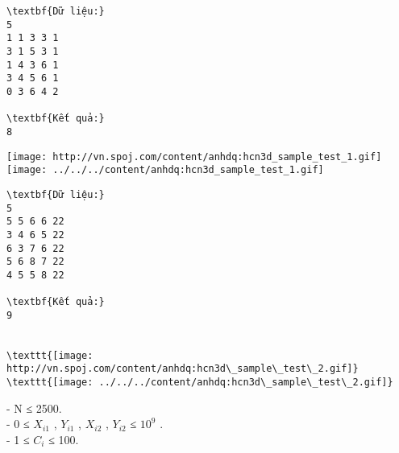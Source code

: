 \begin{verbatim}
\textbf{Dữ liệu:}
5
1 1 3 3 1
3 1 5 3 1
1 4 3 6 1
3 4 5 6 1
0 3 6 4 2

\textbf{Kết quả:}
8
\end{verbatim}


\texttt{[image: http://vn.spoj.com/content/anhdq:hcn3d\_sample\_test\_1.gif]}
\texttt{[image: ../../../content/anhdq:hcn3d\_sample\_test\_1.gif]}
\begin{verbatim}
\textbf{Dữ liệu:}
5
5 5 6 6 22
3 4 6 5 22
6 3 7 6 22
5 6 8 7 22
4 5 5 8 22

\textbf{Kết quả:}
9


\texttt{[image: http://vn.spoj.com/content/anhdq:hcn3d\_sample\_test\_2.gif]}
\texttt{[image: ../../../content/anhdq:hcn3d\_sample\_test\_2.gif]}\end{verbatim}
- N ≤ 2500.
\\- 0 ≤ $X_{i1}$ , $Y_{i1}$ , $X_{i2}$ , $Y_{i2}$ ≤ $10^{9}$ .
\\- 1 ≤ $C_{i}$ ≤ 100.